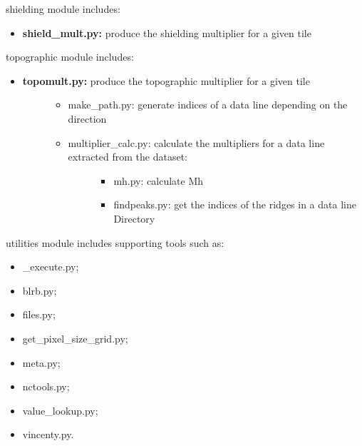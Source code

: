 \documentclass[letterpaper,10pt,english]{sphinxmanual}
\begin{document}
shielding module includes:
\begin{itemize}
\item {} 
\textbf{shield\_mult.py:} produce the shielding multiplier for a given tile

\end{itemize}

topographic module includes:
\begin{itemize}
\item {} \begin{description}
\item[{\textbf{topomult.py:} produce the topographic multiplier for a given tile}] \leavevmode\begin{itemize}
\item {} 
make\_path.py: generate indices of a data line depending on the direction

\item {} \begin{description}
\item[{multiplier\_calc.py: calculate the multipliers for a data line extracted from the dataset:}] \leavevmode\begin{itemize}
\item {} 
mh.py: calculate Mh

\item {} 
findpeaks.py: get the indices of the ridges in a data line Directory

\end{itemize}

\end{description}

\end{itemize}

\end{description}

\end{itemize}

utilities module includes supporting tools such as:
\begin{itemize}
\item {} 
\_execute.py;

\item {} 
blrb.py;

\item {} 
files.py;

\item {} 
get\_pixel\_size\_grid.py;

\item {} 
meta.py;

\item {} 
nctools.py;

\item {} 
value\_lookup.py;

\item {} 
vincenty.py.

\end{itemize}
\end{document}
